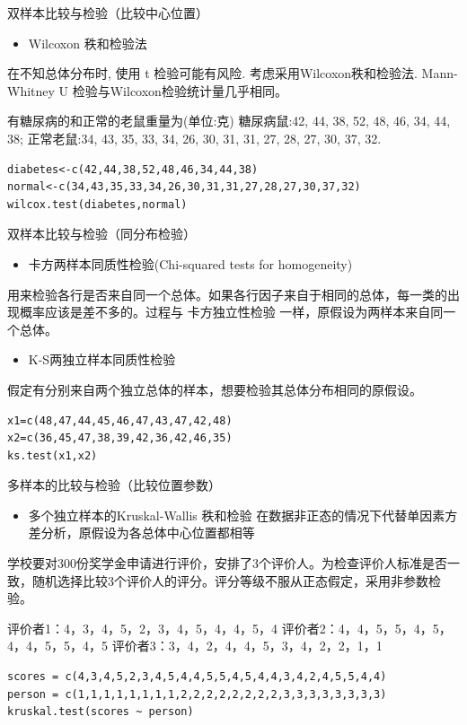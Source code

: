 \documentclass[presentation]{beamer}
\begin{document}
\begin{frame}[fragile,label={sec:org5a41c4a}]{双样本比较与检验（比较中心位置）}
 \begin{itemize}
\item Wilcoxon 秩和检验法
\end{itemize}
在不知总体分布时, 使用 t 检验可能有风险. 考虑采用Wilcoxon秩和检验法.    
Mann-Whitney U 检验与Wilcoxon检验统计量几乎相同。

有糖尿病的和正常的老鼠重量为(单位:克)  
糖尿病鼠:42, 44, 38, 52, 48, 46, 34, 44, 38;  
正常老鼠:34, 43, 35, 33, 34, 26, 30, 31, 31, 27, 28, 27, 30, 37, 32.  
\begin{verbatim}
diabetes<-c(42,44,38,52,48,46,34,44,38)
normal<-c(34,43,35,33,34,26,30,31,31,27,28,27,30,37,32)
wilcox.test(diabetes,normal)
\end{verbatim}
\end{frame}
\begin{frame}[fragile,label={sec:orgcb4ef3a}]{双样本比较与检验（同分布检验）}
 \begin{itemize}
\item 卡方两样本同质性检验(Chi-squared tests for homogeneity)
\end{itemize}
用来检验各行是否来自同一个总体。如果各行因子来自于相同的总体，每一类的出现概率应该是差不多的。过程与 \alert{卡方独立性检验} 一样，原假设为两样本来自同一个总体。  

\begin{itemize}
\item K-S两独立样本同质性检验
\end{itemize}
假定有分别来自两个独立总体的样本，想要检验其总体分布相同的原假设。
\begin{verbatim}
x1=c(48,47,44,45,46,47,43,47,42,48)  
x2=c(36,45,47,38,39,42,36,42,46,35)  
ks.test(x1,x2) 
\end{verbatim}
\end{frame}
\begin{frame}[fragile,label={sec:orgafbb9da}]{多样本的比较与检验（比较位置参数）}
 \begin{itemize}
\item 多个独立样本的Kruskal-Wallis 秩和检验  
在数据非正态的情况下代替单因素方差分析，原假设为各总体中心位置都相等
\end{itemize}

学校要对300份奖学金申请进行评价，安排了3个评价人。为检查评价人标准是否一致，随机选择比较3个评价人的评分。评分等级不服从正态假定，采用非参数检验。  

评价者1：4，3，4，5，2，3，4，5，4，4，5，4   
评价者2：4，4，5，5，4，5，4，4，5，5，4，5   
评价者3：3，4，2，4，4，5，3，4，2，2，1，1  
\begin{verbatim}
scores = c(4,3,4,5,2,3,4,5,4,4,5,5,4,5,4,4,3,4,2,4,5,5,4,4)
person = c(1,1,1,1,1,1,1,1,2,2,2,2,2,2,2,2,3,3,3,3,3,3,3,3)
kruskal.test(scores ~ person)
\end{verbatim}
\end{frame}
\end{document}
